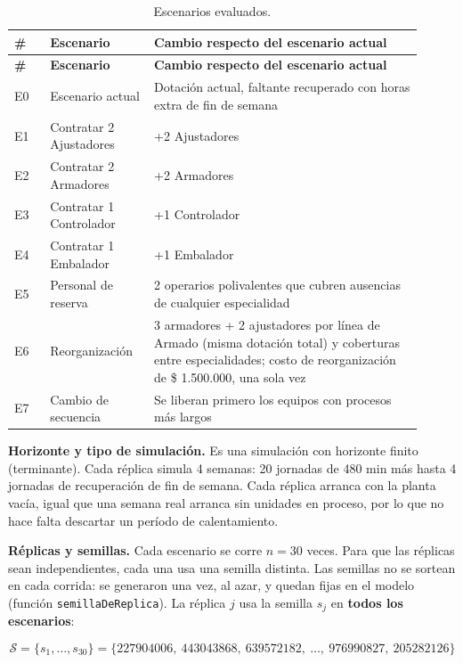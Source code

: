 \documentclass[11pt,a4paper]{article}
\begin{document}
{\small
\begin{longtable}{P{0.080\linewidth}P{0.230\linewidth}P{0.600\linewidth}}
\caption{Escenarios evaluados.}\\
\textbf{\#} & \textbf{Escenario} & \textbf{Cambio respecto del escenario actual} \\
\endfirsthead
{}\textbf{\#} & \textbf{Escenario} & \textbf{Cambio respecto del escenario actual} \\
\endhead
E0 & Escenario actual & Dotación actual, faltante recuperado con horas extra de fin de semana \\
E1 & Contratar 2 Ajustadores & +2 Ajustadores \\
E2 & Contratar 2 Armadores & +2 Armadores \\
E3 & Contratar 1 Controlador & +1 Controlador \\
E4 & Contratar 1 Embalador & +1 Embalador \\
E5 & Personal de reserva & 2 operarios polivalentes que cubren ausencias de cualquier especialidad \\
E6 & Reorganización & 3 armadores + 2 ajustadores por línea de Armado (misma dotación total) y coberturas entre especialidades; costo de reorganización de \$ 1.500.000, una sola vez \\
E7 & Cambio de secuencia & Se liberan primero los equipos con procesos más largos \\
\end{longtable}
}

\textbf{Horizonte y tipo de simulación.} Es una simulación con horizonte finito (terminante). Cada réplica simula 4 semanas: 20 jornadas de 480 min más hasta 4 jornadas de recuperación de fin de semana. Cada réplica arranca con la planta vacía, igual que una semana real arranca sin unidades en proceso, por lo que no hace falta descartar un período de calentamiento.

\textbf{Réplicas y semillas.} Cada escenario se corre $n = 30$ veces. Para que las réplicas sean independientes, cada una usa una semilla distinta. Las semillas no se sortean en cada corrida: se generaron una vez, al azar, y quedan fijas en el modelo (función \texttt{semillaDeReplica}). La réplica $j$ usa la semilla $s_j$ en \textbf{todos los escenarios}:

\[\mathcal{S} = \{s_1, \dots, s_{30}\} = \{227904006,\ 443043868,\ 639572182,\ \dots,\ 976990827,\ 205282126\}\]
\end{document}
